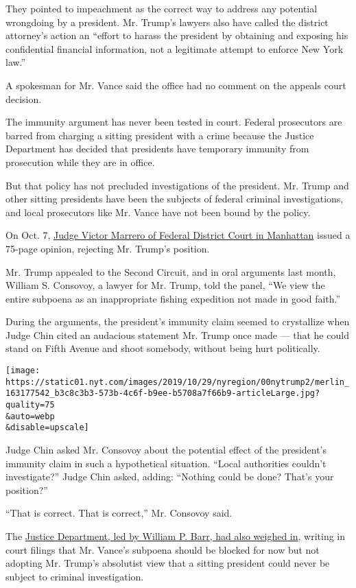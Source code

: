 They pointed to impeachment as the correct way to address any potential
wrongdoing by a president. Mr. Trump's lawyers also have called the
district attorney's action an ``effort to harass the president by
obtaining and exposing his confidential financial information, not a
legitimate attempt to enforce New York law.''

A spokesman for Mr. Vance said the office had no comment on the appeals
court decision.

The immunity argument has never been tested in court. Federal
prosecutors are barred from charging a sitting president with a crime
because the Justice Department has decided that presidents have
temporary immunity from prosecution while they are in office.

But that policy has not precluded investigations of the president. Mr.
Trump and other sitting presidents have been the subjects of federal
criminal investigations, and local prosecutors like Mr. Vance have not
been bound by the policy.

On Oct. 7,
\href{https://www.nytimes.com/2019/10/07/nyregion/trump-tax-returns-new-york.html}{Judge
Victor Marrero of Federal District Court in Manhattan} issued a 75-page
opinion, rejecting Mr. Trump's position.

Mr. Trump appealed to the Second Circuit, and in oral arguments last
month, William S. Consovoy, a lawyer for Mr. Trump, told the panel, ``We
view the entire subpoena as an inappropriate fishing expedition not made
in good faith.''

During the arguments, the president's immunity claim seemed to
crystallize when Judge Chin cited an audacious statement Mr. Trump once
made --- that he could stand on Fifth Avenue and shoot somebody, without
being hurt politically.

\texttt{[image: https://static01.nyt.com/images/2019/10/29/nyregion/00nytrump2/merlin\_163177542\_b3c8c3b3-573b-4c6f-b9ee-b5708a7f66b9-articleLarge.jpg?quality=75\\\&auto=webp\\\&disable=upscale]}

Judge Chin asked Mr. Consovoy about the potential effect of the
president's immunity claim in such a hypothetical situation. ``Local
authorities couldn't investigate?'' Judge Chin asked, adding: ``Nothing
could be done? That's your position?''

``That is correct. That is correct,'' Mr. Consovoy said.

The
\href{https://www.nytimes.com/2019/10/02/nyregion/trump-taxes-lawsuit.html?module=inline}{Justice
Department, led by William P. Barr, had also weighed in}, writing in
court filings that Mr. Vance's subpoena should be blocked for now but
not adopting Mr. Trump's absolutist view that a sitting president could
never be subject to criminal investigation.

